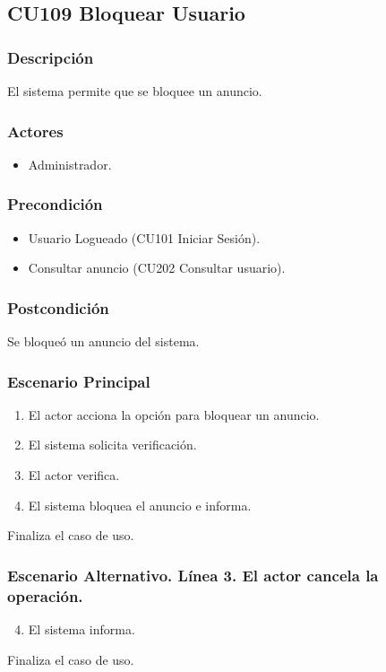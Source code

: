 \subsection{CU109 Bloquear Usuario}
\subsubsection{Descripci\'{o}n}
El sistema permite que se bloquee un anuncio.
\subsubsection{Actores}
\begin{itemize}
\item Administrador.
\end{itemize}
\subsubsection{Precondici\'{o}n}
\begin{itemize}
\item Usuario Logueado (CU101 Iniciar Sesi\'{o}n).
\item Consultar anuncio (CU202 Consultar usuario).
\end{itemize}
\subsubsection{Postcondici\'{o}n}
Se bloque\'{o} un anuncio del sistema.
\subsubsection{Escenario Principal}
\begin{enumerate}
\item El actor acciona la opci\'{o}n para bloquear un anuncio.
\item El sistema solicita verificaci\'{o}n.
\item El actor verifica.
\item El sistema bloquea el anuncio e informa.
\end{enumerate}
Finaliza el caso de uso.
\subsubsection{Escenario Alternativo. L\'{i}nea 3. El actor cancela la operaci\'{o}n.}
\begin{enumerate}
\setcounter{enumi}{3}
\item El sistema informa.
\end{enumerate}
Finaliza el caso de uso.